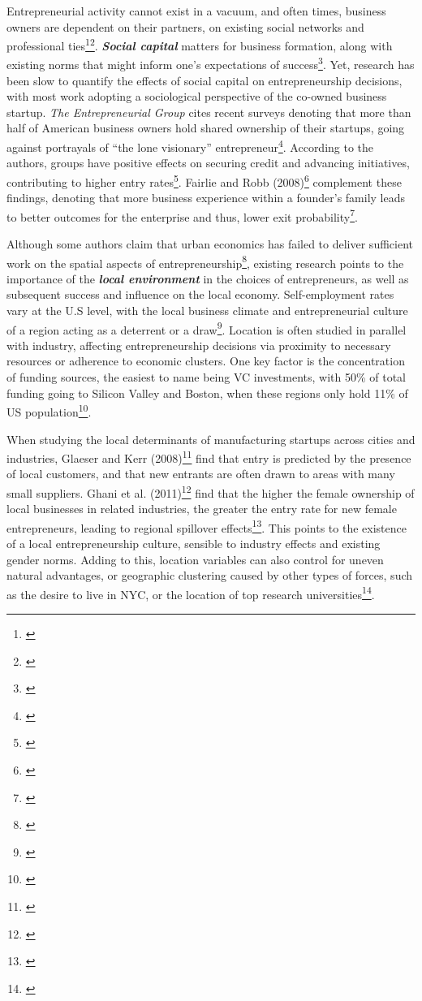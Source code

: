 Entrepreneurial activity cannot exist in a vacuum, and often times, business owners are dependent on their partners, on existing social networks and professional ties\footnote{\cite{Lerner2009}}\hspace{.15em}\footnote{\cite[Page~74]{Parker2004}}. \textbf{\textit{Social capital}} matters for business formation, along with existing norms that might inform one's expectations of success\footnote{\cite{Lerner2009}}. Yet, research has been slow to quantify the effects of social capital on entrepreneurship decisions, with most work adopting a sociological perspective of the co-owned business startup. \textit{The Entrepreneurial Group} cites recent surveys denoting that more than half of American business owners hold shared ownership of their startups, going against portrayals of ``the lone visionary'' entrepreneur\footnote{\cite{Ruef2010}}. According to the authors, groups have positive effects on securing credit and advancing initiatives, contributing to higher entry rates\footnote{\cite{Ruef2010}}. Fairlie and Robb (2008)\footnote{\cite{FairlieRobb2008}} complement these findings, denoting that more business experience within a founder's family leads to better outcomes for the enterprise and thus, lower exit probability\footnote{\cite{FairlieRobb2008}}. 


Although some authors claim that urban economics has failed to deliver sufficient work on the spatial aspects of entrepreneurship\footnote{\cite{GlaeserRosenthalStrange2009}}, existing research points to the importance of the \textbf{\textit{local environment}} in the choices of entrepreneurs, as well as subsequent success and influence on the local economy. Self-employment rates vary at the U.S level, with the local business climate and entrepreneurial culture of a region acting as a deterrent or a draw\footnote{\cite{PatrickStephensWeinstein2016}}. Location is often studied in parallel with industry, affecting entrepreneurship decisions via proximity to necessary resources or adherence to economic clusters. One key factor is the concentration of funding sources, the easiest to name being VC investments, with 50\% of total funding going to Silicon Valley and Boston, when these regions only hold 11\% of US population\footnote{\cite{ChatterjiGlaeserKerr2014}}. 

When studying the local determinants of manufacturing startups across cities and industries, Glaeser and Kerr (2008)\footnote{\cite{GlaeserKerr2008}} find that entry is predicted by the presence of local customers, and that new entrants are often drawn to areas with many small suppliers. Ghani et al. (2011)\footnote{\cite{GhaniKerrOConnell2011}} find that the higher the female ownership of local businesses in related industries, the greater the entry rate for new female entrepreneurs, leading to regional spillover effects\footnote{\cite{GhaniKerrOConnell2011}}. This points to the existence of a local entrepreneurship culture, sensible to industry effects and existing gender norms. Adding to this, location variables can also control for uneven natural advantages, or geographic clustering caused by other types of forces, such as the desire to live in NYC, or the location of top research universities\footnote{\cite{ChatterjiGlaeserKerr2014}}. 

